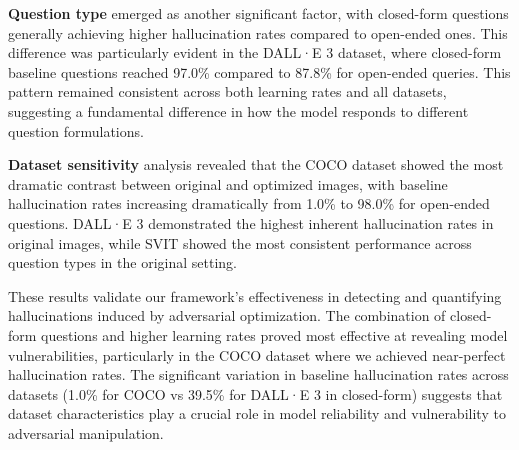 \documentclass[runningheads]{llncs}
\begin{document}
\textbf{Question type} emerged as another significant factor, with closed-form questions generally achieving higher hallucination rates compared to open-ended ones. This difference was particularly evident in the DALL·E 3 dataset, where closed-form baseline questions reached 97.0\% compared to 87.8\% for open-ended queries. This pattern remained consistent across both learning rates and all datasets, suggesting a fundamental difference in how the model responds to different question formulations.

\textbf{Dataset sensitivity} analysis revealed that the COCO dataset showed the most dramatic contrast between original and optimized images, with baseline hallucination rates increasing dramatically from 1.0\% to 98.0\% for open-ended questions. DALL·E 3 demonstrated the highest inherent hallucination rates in original images, while SVIT showed the most consistent performance across question types in the original setting.

These results validate our framework's effectiveness in detecting and quantifying hallucinations induced by adversarial optimization. The combination of closed-form questions and higher learning rates proved most effective at revealing model vulnerabilities, particularly in the COCO dataset where we achieved near-perfect hallucination rates. The significant variation in baseline hallucination rates across datasets (1.0\% for COCO vs 39.5\% for DALL·E 3 in closed-form) suggests that dataset characteristics play a crucial role in model reliability and vulnerability to adversarial manipulation.
\end{document}
